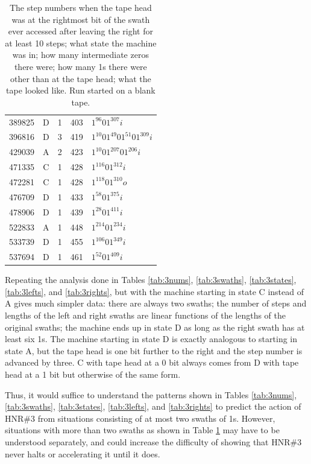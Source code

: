 \documentclass[12pt]{article}
\begin{document}
\begin{small}
\begin{table}[H]
\begin{Parallel}[c]{0.48\textwidth}{0.48\textwidth}
{{\begin{tabular}{rcccl}
389825&D&1&403&$1^{96}01^{307}i$\\
396816&D&3&419&$1^{10}01^{49}01^{51}01^{309}i$\\
429039&A&2&423&$1^{10}01^{207}01^{206}i$\\
471335&C&1&428&$1^{116}01^{312}i$\\
472281&C&1&428&$1^{118}01^{310}o$\\
476709&D&1&433&$1^{58}01^{375}i$\\
478906&D&1&439&$1^{28}01^{411}i$\\
522833&A&1&448&$1^{214}01^{234}i$\\
533739&D&1&455&$1^{106}01^{349}i$\\
537694&D&1&461&$1^{52}01^{409}i$\\
\end{tabular}}}
\end{Parallel}
\caption{\label{tab:3steps}The step numbers when the tape head was at the rightmost bit of the swath ever accessed after leaving the right for at least 10 steps; what state the machine was in; how many intermediate zeros there were; how many 1s there were other than at the tape head; what the tape looked like. Run started on a blank tape.}
\end{table}
\end{small}

\clearpage
Repeating the analysis done in Tables \ref{tab:3nums}, \ref{tab:3swaths}, \ref{tab:3states}, \ref{tab:3lefts}, and \ref{tab:3rights}, but with the machine starting in state C instead of A gives much simpler data: there are always two swaths; the number of steps and lengths of the left and right swaths are linear functions of the lengths of the original swaths; the machine ends up in state D as long as the right swath has at least six 1s. The machine starting in state D is exactly analogous to starting in state A, but the tape head is one bit further to the right and the step number is advanced by three. C with tape head at a 0 bit always comes from D with tape head at a 1 bit but otherwise of the same form.

Thus, it would suffice to understand the patterns shown in Tables \ref{tab:3nums}, \ref{tab:3swaths}, \ref{tab:3states}, \ref{tab:3lefts}, and \ref{tab:3rights} to predict the action of HNR\#3 from situations consisting of at most two swaths of 1s. However, situations with more than two swaths as shown in Table \ref{tab:3steps} may have to be understood separately, and could increase the difficulty of showing that HNR\#3 never halts or accelerating it until it does.
\end{document}
